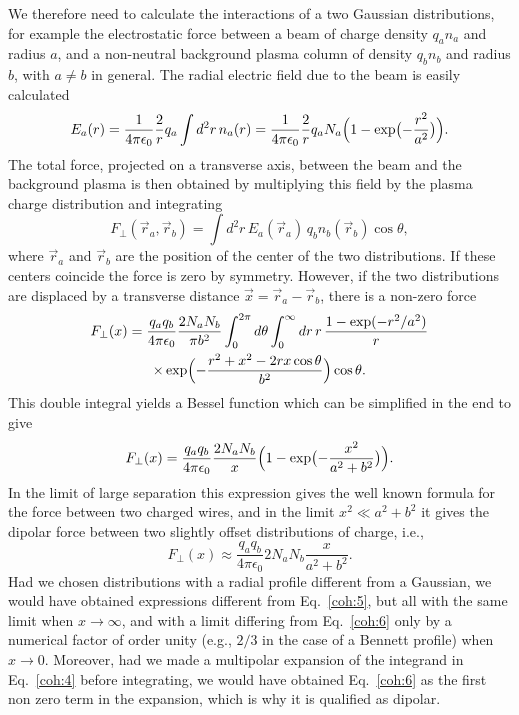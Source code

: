\documentclass [12pt,a4paper,     ]{report} %
\begin{document}
  We therefore need to calculate the interactions of a two Gaussian distributions, for example the electrostatic force between a beam of charge density $q_a n_a$ and radius $a$, and a non-neutral background plasma column of density $q_b n_b$ and radius $b$, with $a \neq b$ in general.  The radial electric field due to the beam is easily calculated
%
\begin{equation}\label{coh:2} %
     E_a(r) = \frac{1}{4\pi \epsilon_0} \frac {2}{r} q_a \int d^2 r \, n_a(r)
            = \frac{1}{4\pi \epsilon_0} \frac {2}{r} q_a N_a
               \Bigl( 1 - \exp \bigl( -\frac{r^2}{a^2}\bigr) \Bigr).
\end{equation}
%
The total force, projected on a transverse axis, between the beam and the background plasma is then obtained by multiplying this field by the plasma charge distribution and integrating
%
\begin{equation}\label{coh:3} %
   F_{\perp}(\vec{r}_a,\vec{r}_b) =  \int d^2 r \, 
              E_a(\vec{r}_a) \, q_b n_b(\vec{r}_b) \cos \theta,
\end{equation}
%
where $\vec{r}_a$ and $\vec{r}_b$ are the position of the center of the two distributions.  If these centers coincide the force is zero by symmetry.  However, if the two distributions are displaced by a transverse distance $\vec{x} = \vec{r}_a - \vec{r}_b$, there is a non-zero force 
%
\begin{multline}\label{coh:4} %
   F_{\perp}(x) =  
              \frac{q_a q_b}{4\pi \epsilon_0} \frac {2 N_a N_b}{\pi b^2}
              \int_0^{2\pi} d\theta \int_0^\infty dr \, r \,
              \frac{1 - \exp ( -{r^2}/{a^2} )}{r} \\
              \times
              \exp \Bigl( -\frac{r^2 + x^2 - 2 r x \cos \theta}{b^2}\Bigr)
              \cos \theta.
\end{multline}
%
This double integral yields a Bessel function which can be simplified in the end to give
%
\begin{equation}\label{coh:5} %
   F_{\perp}(x) =  \frac{q_a q_b}{4\pi \epsilon_0} \frac {2 N_a N_b}{x}
                \Bigl(1 - \exp \bigl( -\frac{x^2}{a^2+b^2} \bigr)  \Bigr).
\end{equation}
%
In the limit of large separation this expression gives the well known formula for the force between two charged wires, and in the limit $x^2 \ll a^2+b^2$ it gives the dipolar force between two slightly offset distributions of charge, i.e., 
%
\begin{equation}\label{coh:6} %
   F_{\perp}(x) \approx  \frac{q_a q_b}{4\pi \epsilon_0} 2 N_a N_b
                       \frac{x}{a^2+b^2}.
\end{equation}
%
Had we chosen distributions with a radial profile different from a Gaussian, we would have obtained expressions different from Eq.~\eqref{coh:5}, but all with the same limit when $x \rightarrow \infty$, and with  a limit differing from Eq.~\eqref{coh:6} only by a numerical factor of order unity (e.g., $2/3$ in the case of a Bennett profile) when $x \rightarrow 0$.  Moreover, had we made a multipolar expansion of the integrand in Eq.~\eqref{coh:4} before integrating, we would have obtained Eq.~\eqref{coh:6} as the first non zero term in the expansion, which is why it is qualified as dipolar. 
\end{document}
